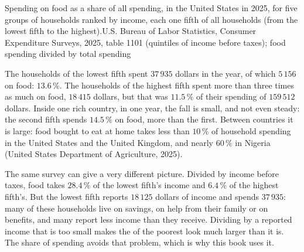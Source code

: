 \begin{omchart}{Spending on food as a share of all spending, in the United States in
2025, for five groups of households ranked by income, each one fifth of all
households (from the lowest fifth to the highest).}{U.S. Bureau of Labor
Statistics, Consumer Expenditure Surveys, 2025, table 1101 (quintiles of income
before taxes); food spending divided by total spending}
\end{omchart}

The households of the lowest fifth spent $37\,935$ dollars in the year, of which
$5\,156$ on food: $13.6\,\%$. The households of the highest fifth spent more than
three times as much on food, $18\,415$ dollars, but that was $11.5\,\%$ of their
spending of $159\,512$ dollars. Inside one rich country, in one year, the fall is
small, and not even steady: the second fifth spends $14.5\,\%$ on food, more than
the first. Between countries it is large: food bought to eat at home takes less
than $10\,\%$ of household spending in the United States and the United Kingdom,
and nearly $60\,\%$ in Nigeria (United States Department of Agriculture, 2025).

\begin{measure}
The same survey can give a very different picture. Divided by income before taxes,
food takes $28.4\,\%$ of the lowest fifth's income and $6.4\,\%$ of the highest
fifth's. But the lowest fifth reports $18\,125$ dollars of income and spends
$37\,935$: many of these households live on savings, on help from their family or
on benefits, and many report less income than they receive. Dividing by a reported
income that is too small makes the  of the poorest look much larger than
it is. The share of spending avoids that problem, which is why this book uses it.
\end{measure}

